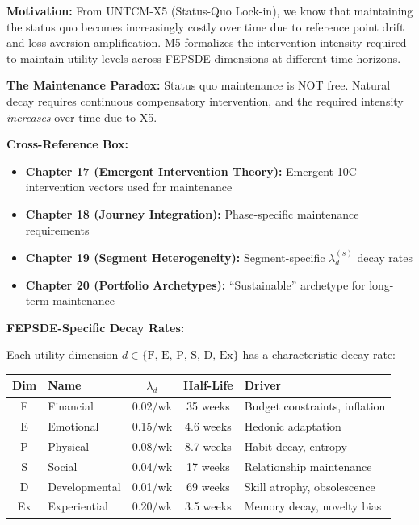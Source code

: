 \begin{tcolorbox}[colback=orange!5!white, colframe=orange!75!black,
    title=\textbf{Method UNTCM-M5: Maintenance Cost Analysis}]

\textbf{Motivation:} From UNTCM-X5 (Status-Quo Lock-in), we know that maintaining the status quo becomes increasingly costly over time due to reference point drift and loss aversion amplification. M5 formalizes the intervention intensity required to maintain utility levels across FEPSDE dimensions at different time horizons.

\textbf{The Maintenance Paradox:} Status quo maintenance is NOT free. Natural decay requires continuous compensatory intervention, and the required intensity \emph{increases} over time due to X5.

\textbf{Cross-Reference Box:}
\begin{itemize}[nosep]
\item \textbf{Chapter 17 (Emergent Intervention Theory):} Emergent 10C intervention vectors used for maintenance
\item \textbf{Chapter 18 (Journey Integration):} Phase-specific maintenance requirements
\item \textbf{Chapter 19 (Segment Heterogeneity):} Segment-specific $\lambda_d^{(s)}$ decay rates
\item \textbf{Chapter 20 (Portfolio Archetypes):} ``Sustainable'' archetype for long-term maintenance
\end{itemize}

\textbf{FEPSDE-Specific Decay Rates:}

Each utility dimension $d \in \{\text{F, E, P, S, D, Ex}\}$ has a characteristic decay rate:

\begin{center}
\renewcommand{\arraystretch}{1.2}
\begin{tabular}{@{}clccl@{}}
\toprule
\textbf{Dim} & \textbf{Name} & \textbf{$\lambda_d$} & \textbf{Half-Life} & \textbf{Driver} \\
\midrule
F & Financial & 0.02/wk & 35 weeks & Budget constraints, inflation \\
E & Emotional & 0.15/wk & 4.6 weeks & Hedonic adaptation \\
P & Physical & 0.08/wk & 8.7 weeks & Habit decay, entropy \\
S & Social & 0.04/wk & 17 weeks & Relationship maintenance \\
D & Developmental & 0.01/wk & 69 weeks & Skill atrophy, obsolescence \\
Ex & Experiential & 0.20/wk & 3.5 weeks & Memory decay, novelty bias \\
\bottomrule
\end{tabular}
\end{center}


\end{tcolorbox}
